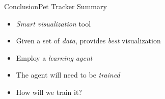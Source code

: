 \begin{frame}{Conclusion}{Pet Tracker}
    Summary
    \begin{itemize}
        \item \textit{Smart visualization} tool
        \item Given a set of \textit{data}, provides \textit{best} visualization
        \item Employ a \textit{learning agent}
        \item The agent will need to be \textit{trained}
        \item How will we train it?
    \end{itemize}
  \end{frame}
